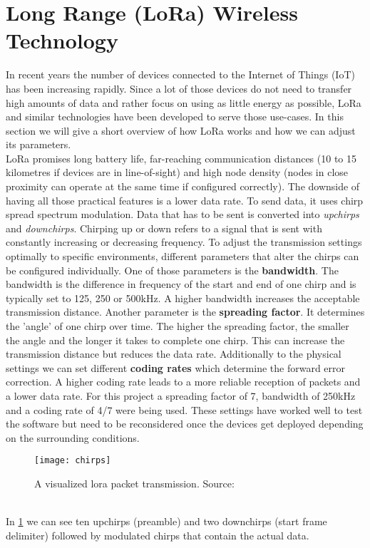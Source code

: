 \section{Long Range (LoRa) Wireless Technology}
\label{sec:lora}
In recent years the number of devices connected to the Internet of Things (IoT) has been increasing rapidly. Since a lot of those devices do not need to transfer high amounts of data and rather focus on using as little energy as possible, LoRa and similar technologies have been developed to serve those use-cases. In this section we will give a short overview of how LoRa works and how we can adjust its parameters. \\
LoRa promises long battery life, far-reaching communication distances (10 to 15 kilometres if devices are in line-of-sight) and high node density (nodes in close proximity can operate at the same time if configured correctly). The downside of having all those practical features is a lower data rate. To send data, it uses chirp spread spectrum modulation. Data that has to be sent is converted into \textit{upchirps} and \textit{downchirps}. Chirping up or down refers to a signal that is sent with constantly increasing or decreasing frequency. To adjust the transmission settings optimally to specific environments, different parameters that alter the chirps can be configured individually. One of those parameters is the \textbf{bandwidth}. The bandwidth is the difference in frequency of the start and end of one chirp and is typically set to 125, 250 or 500kHz. A higher bandwidth increases the acceptable transmission distance. Another parameter is the \textbf{spreading factor}. It determines the 'angle' of one chirp over time. The higher the spreading factor, the smaller the angle and the longer it takes to complete one chirp. This can increase the transmission distance but reduces the data rate. Additionally to the physical settings we can set different \textbf{coding rates} which determine the forward error correction. A higher coding rate leads to a more reliable reception of packets and a lower data rate.
For this project a spreading factor of 7, bandwidth of 250kHz and a coding rate of 4/7 were being used. These settings have worked well to test the software but need to be reconsidered once the devices get deployed depending on the surrounding conditions.
\begin{figure}
\centering
\texttt{[image: chirps]}
\caption{A visualized lora packet transmission. Source:~\cite{10.1145/3293534}}
\label{fig:chirps}
\end{figure} \\
In \cref{fig:chirps} we can see ten upchirps (preamble) and two downchirps (start frame delimiter) followed by modulated chirps that contain the actual data. 


